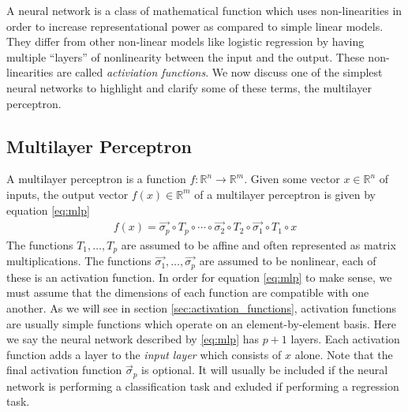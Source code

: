 A neural network is a class of mathematical function which uses non-linearities in order to increase representational power as compared to simple linear models.  They differ from other non-linear models like logistic regression by having multiple ``layers'' of nonlinearity between the input and the output.  These non-linearities are called \textit{activiation functions}.  We now discuss one of the simplest neural networks to highlight and clarify some of these terms, the multilayer perceptron. 

\subsection{Multilayer Perceptron}
A multilayer perceptron is a function $f:\mathbb{R}^n\rightarrow \mathbb{R}^m$. Given some vector $x\in \mathbb{R}^n$ of inputs, the output vector $f(x)\in\mathbb{R}^m$ of a multilayer perceptron is given by equation \ref{eq:mlp}
\begin{align}\label{eq:mlp}
    f(x) = \vec{\sigma_p} \circ T_p \circ\cdots\circ \vec{\sigma_2}\circ T_2\circ \vec{\sigma_1} \circ T_1\circ x
\end{align}
The functions $T_1,\dots,T_p$ are assumed to be affine and often represented as matrix multiplications.  The functions $\vec{\sigma_1},\dots,\vec{\sigma_p}$ are assumed to be nonlinear, each of these is an activation function.  In order for equation \ref{eq:mlp} to make sense, we must assume that the dimensions of each function are compatible with one another.  As we will see in section \ref{sec:activation_functions}, activation functions are usually simple functions which operate on an element-by-element basis.  Here we say the neural network described by \ref{eq:mlp} has $p+1$ layers.  Each activation function adds a layer to the \textit{input layer} which consists of $x$ alone.  Note that the final activation function $\vec{\sigma}_p$ is optional.  It will usually be included if the neural network is performing a classification task and exluded if performing a regression task.

